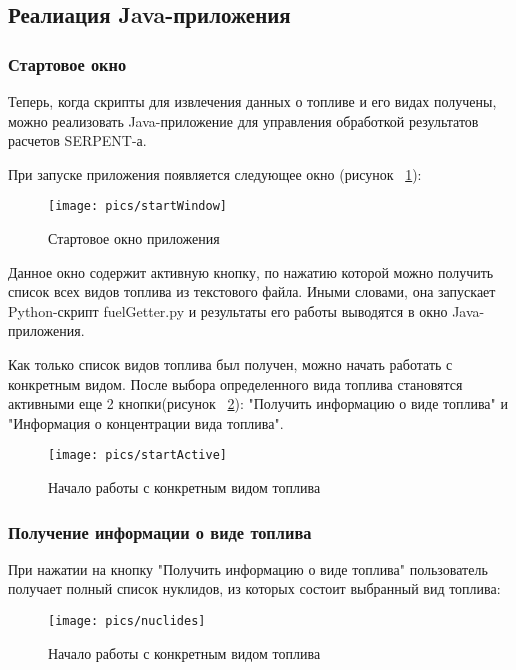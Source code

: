 \subsection{Реалиация Java-приложения}

\subsubsection{Стартовое окно}

Теперь, когда скрипты для извлечения данных о топливе и его видах получены, можно реализовать Java-приложение \cite{shild} для управления обработкой результатов расчетов SERPENT-а. 

При запуске приложения появляется следующее окно (рисунок ~\ref{fig:startWindow}):

\begin{figure}[H]
	\centering
	\texttt{[image: pics/startWindow]}
	\caption{Стартовое окно приложения}
	\label{fig:startWindow}
\end{figure}

Данное окно содержит активную кнопку, по нажатию которой можно получить список всех видов топлива из текстового файла. Иными словами, она запускает Python-скрипт fuelGetter.py и результаты его работы выводятся в окно Java-приложения.

Как только список видов топлива был получен, можно начать работать с конкретным видом. После выбора определенного вида топлива становятся активными еще 2 кнопки(рисунок ~\ref{fig:startActive}): "Получить информацию о виде топлива" и "Информация о концентрации вида топлива".

\begin{figure}[H]
	\centering
	\texttt{[image: pics/startActive]}
	\caption{Начало работы с конкретным видом топлива}
	\label{fig:startActive}
\end{figure}

\subsubsection{Получение информации о виде топлива}

При нажатии на кнопку  "Получить информацию о виде топлива" пользователь получает полный список нуклидов, из которых состоит выбранный вид топлива:

\begin{figure}[H]
	\centering
	\texttt{[image: pics/nuclides]}
	\caption{Начало работы с конкретным видом топлива}
	\label{fig:nuclides}
\end{figure}

